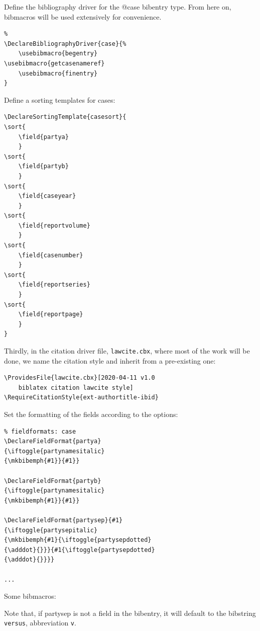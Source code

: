 Define the bibliography driver for the @case bibentry type. From here on, bibmacros will be used extensively for convenience.

\begin{verbatim}
%
\DeclareBibliographyDriver{case}{%
	\usebibmacro{begentry}
\usebibmacro{getcasenameref}
	\usebibmacro{finentry}
}

\end{verbatim}

Define a sorting templates for cases:

\begin{verbatim}
\DeclareSortingTemplate{casesort}{
\sort{
	\field{partya}
	}
\sort{
	\field{partyb}
	}
\sort{
	\field{caseyear}
	}
\sort{
	\field{reportvolume}
	} 
\sort{
	\field{casenumber}
	} 
\sort{
	\field{reportseries}
	} 
\sort{
	\field{reportpage}
	} 
}
\end{verbatim}

Thirdly, in the citation driver file, \verb|lawcite.cbx|, where most of the work will be done, we name the citation style and inherit from a pre-existing one:

\begin{verbatim}
\ProvidesFile{lawcite.cbx}[2020-04-11 v1.0
    biblatex citation lawcite style]
\RequireCitationStyle{ext-authortitle-ibid}
\end{verbatim}

Set the formatting of the fields according to the options:

\begin{verbatim}
% fieldformats: case
\DeclareFieldFormat{partya}
{\iftoggle{partynamesitalic}
{\mkbibemph{#1}}{#1}}

\DeclareFieldFormat{partyb}
{\iftoggle{partynamesitalic}
{\mkbibemph{#1}}{#1}}

\DeclareFieldFormat{partysep}{#1}
{\iftoggle{partysepitalic}
{\mkbibemph{#1}{\iftoggle{partysepdotted}
{\adddot}{}}}{#1{\iftoggle{partysepdotted}
{\adddot}{}}}}

...
\end{verbatim}

Some bibmacros:

Note that, if partysep is not a field in the bibentry, it will default to the bibstring \verb|versus|, abbreviation \verb|v|.
 
